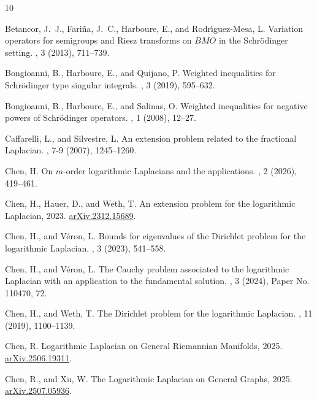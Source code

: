 \documentclass[10pt, a4paper, reqno]{amsart}
\theoremstyle{definition}
\theoremstyle{remark}
\numberwithin{equation}{section}
\begin{document}
\begin{thebibliography}{10}

{\sc Betancor, J.~J., Fari\~{n}a, J.~C., Harboure, E., and Rodr\'{\i}guez-Mesa, L.}
\newblock Variation operators for semigroups and {R}iesz transforms on {$BMO$} in the {S}chr\"{o}dinger setting.
, 3 (2013), 711--739.

{\sc Bongioanni, B., Harboure, E., and Quijano, P.}
\newblock Weighted inequalities for {S}chr\"{o}dinger type singular integrals.
, 3 (2019), 595--632.

{\sc Bongioanni, B., Harboure, E., and Salinas, O.}
\newblock Weighted inequalities for negative powers of {S}chr\"{o}dinger operators.
, 1 (2008), 12--27.

{\sc Caffarelli, L., and Silvestre, L.}
\newblock An extension problem related to the fractional {L}aplacian.
, 7-9 (2007), 1245--1260.

{\sc Chen, H.}
\newblock On {$m$}-order logarithmic {L}aplacians and the applications.
, 2 (2026), 419--461.

{\sc Chen, H., Hauer, D., and Weth, T.}
\newblock An extension problem for the logarithmic {L}aplacian, 2023.
\newblock \href{https://arxiv.org/abs/2312.15689}{arXiv.2312.15689}.

{\sc Chen, H., and V\'{e}ron, L.}
\newblock Bounds for eigenvalues of the {D}irichlet problem for the logarithmic {L}aplacian.
, 3 (2023), 541--558.

{\sc Chen, H., and V\'{e}ron, L.}
\newblock The {C}auchy problem associated to the logarithmic {L}aplacian with an application to the fundamental solution.
, 3 (2024), Paper No. 110470, 72.

{\sc Chen, H., and Weth, T.}
\newblock The {D}irichlet problem for the logarithmic {L}aplacian.
, 11 (2019), 1100--1139.

{\sc Chen, R.}
\newblock Logarithmic {L}aplacian on {G}eneral {R}iemannian {M}anifolds, 2025.
\newblock \href{https://arxiv.org/abs/2506.19311}{arXiv.2506.19311}.

{\sc Chen, R., and Xu, W.}
\newblock The {L}ogarithmic {L}aplacian on {G}eneral {G}raphs, 2025.
\newblock \href{https://arxiv.org/abs/2507.05936}{arXiv.2507.05936}.


\end{thebibliography}
\end{document}
